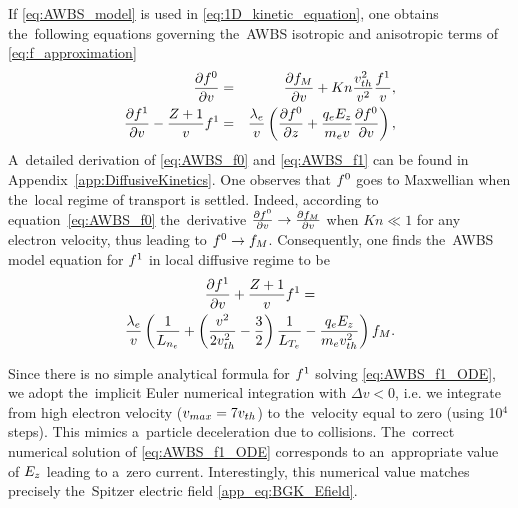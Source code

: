 If \eqref{eq:AWBS_model} is used in \eqref{eq:1D_kinetic_equation}, one obtains
the~following equations governing the~AWBS isotropic and anisotropic terms of 
\eqref{eq:f_approximation}
\begin{eqnarray}
  \frac{\partial{f^0}}{\partial{v}} &=& \frac{\partial{f_M}}{\partial{v}}
  + Kn \frac{v_{th}^2}{v^2}\frac{f^1}{v} ,
  \label{eq:AWBS_f0} \\
  \frac{\partial{f^1}}{\partial{v}}  
  - \frac{Z + 1}{v} f^1 &=& \frac{\lambda_e}{v}
  \left(\frac{\partial{f^0}}{\partial{z}} + \frac{q_eE_z}{m_ev}\frac{\partial{f^0}}{\partial{v}}\right) ,
  \label{eq:AWBS_f1} 
\end{eqnarray}
A~detailed derivation of \eqref{eq:AWBS_f0} and \eqref{eq:AWBS_f1} 
can be found in Appendix~\ref{app:DiffusiveKinetics}.
One observes that $f^0$ goes to Maxwellian when the~local regime of transport 
is settled. Indeed, according to equation~\eqref{eq:AWBS_f0} the~derivative 
$\frac{\partial{f^0}}{\partial{v}}\rightarrow\frac{\partial{f_M}}{\partial{v}}$  when $Kn\ll1$ for any 
electron velocity, thus leading to $f^0\rightarrow f_M$.
Consequently, one finds the~AWBS model equation for $f^1$ 
in local diffusive regime to be
\begin{multline}
  \frac{\partial{f^1}}{\partial{v}} + \frac{Z + 1}{v}f^1
  = \\
  \frac{\lambda_e}{v}\left(\frac{1}{L_{n_e}} + 
  \left( \frac{v^2}{2 v_{th}^2} - \frac{3}{2}\right)
  \frac{1}{L_{T_e}} - \frac{q_eE_z}{m_ev_{th}^2}\right)f_M .
  \label{eq:AWBS_f1_ODE}
\end{multline}

Since there is no simple analytical formula for $f^1$ solving 
\eqref{eq:AWBS_f1_ODE}, we adopt the~implicit Euler numerical integration
with $\Delta v < 0$, i.e. we integrate from high electron velocity 
($v_{max} = 7v_{th}$) to the~velocity equal to zero (using 10$^4$ steps). 
This mimics a~particle deceleration due to collisions. The~correct numerical
solution of \eqref{eq:AWBS_f1_ODE} corresponds to an~appropriate value of 
$E_z$ leading to a~zero current. Interestingly, this numerical value matches
precisely the~Spitzer electric field \eqref{app_eq:BGK_Efield}.

